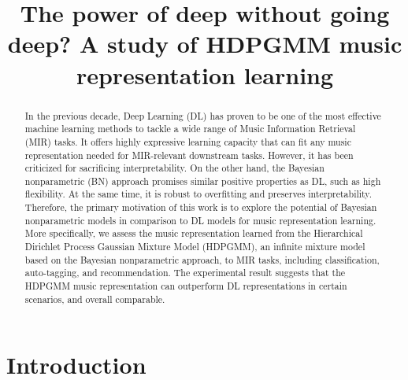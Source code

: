 \documentclass{article}
\title{The power of deep without going deep? A study of HDPGMM music representation learning}
\begin{document}
%
\maketitle
%
\begin{abstract}
    In the previous decade, Deep Learning (DL) has proven to be one of the most effective machine learning methods to tackle a wide range of Music Information Retrieval (MIR) tasks. It offers highly expressive learning capacity that can fit any music representation needed for MIR-relevant downstream tasks. However, it has been criticized for sacrificing interpretability.
    On the other hand, the Bayesian nonparametric (BN) approach promises similar positive properties as DL, such as high flexibility. At the same time, it is robust to overfitting and preserves interpretability. Therefore, the primary motivation of this work is to explore the potential of Bayesian nonparametric models in comparison to DL models for music representation learning.
    More specifically, we assess the music representation learned from the Hierarchical Dirichlet Process Gaussian Mixture Model (HDPGMM), an infinite mixture model based on the Bayesian nonparametric approach, to MIR tasks, including classification, auto-tagging, and recommendation.
    The experimental result suggests that the HDPGMM music representation can outperform DL representations in certain scenarios, and overall comparable.
\end{abstract}
%
\section{Introduction}\label{sec:introduction}
\end{document}
